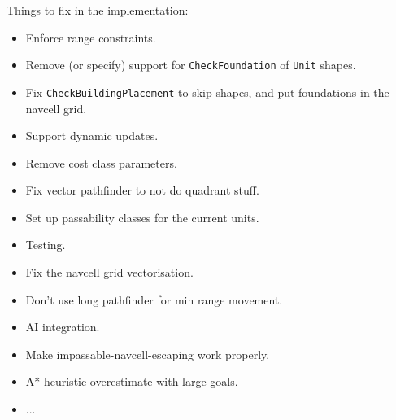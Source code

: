 \documentclass[a4paper,10pt]{article}
\begin{document}
Things to fix in the implementation:
\begin{itemize}
 \item Enforce range constraints.
 \item Remove (or specify) support for \texttt{CheckFoundation} of \texttt{Unit} shapes.
 \item Fix \texttt{CheckBuildingPlacement} to skip shapes, and put foundations in the navcell grid.
 \item Support dynamic updates.
 \item Remove cost class parameters.
 \item Fix vector pathfinder to not do quadrant stuff.
 \item Set up passability classes for the current units.
 \item Testing.
 \item Fix the navcell grid vectorisation.
 \item Don't use long pathfinder for min range movement.
 \item AI integration.
 \item Make impassable-navcell-escaping work properly.
 \item A* heuristic overestimate with large goals.
 \item ...
\end{itemize}
\end{document}
